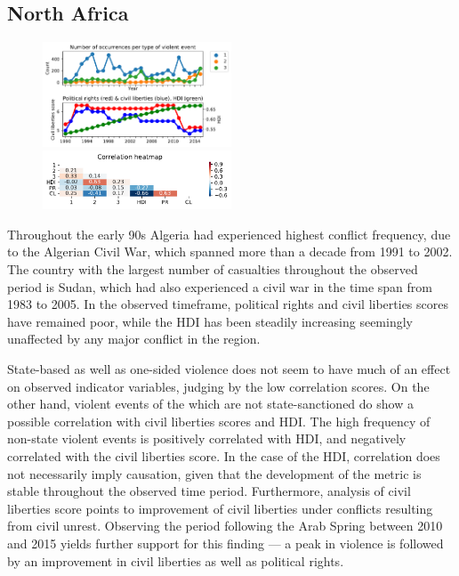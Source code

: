 \documentclass[a4paper,11pt]{article}
\begin{document}
\subsection{North Africa}
\begin{figure}[ht!]
    \includegraphics[width=0.50\textwidth]{images/na.pdf}
    \includegraphics[width=0.50\textwidth]{images/na_corr.pdf}
\end{figure}
Throughout the early 90s Algeria had experienced highest conflict frequency, due to the Algerian Civil War, which spanned more than a decade from 1991 to 2002. The country with the largest number of casualties throughout the observed period is Sudan, which had also experienced a civil war in the time span from 1983 to 2005. In the observed timeframe, political rights and civil liberties scores have remained poor, while the HDI has been steadily increasing seemingly unaffected by any major conflict in the region.

State-based as well as one-sided violence does not seem to have much of an effect on observed indicator variables, judging by the low correlation scores. On the other hand, violent events of the which are not state-sanctioned do show a possible correlation with civil liberties scores and HDI. The high frequency of non-state violent events is positively correlated with HDI, and negatively correlated with the civil liberties score. In the case of the HDI, correlation does not necessarily imply causation, given that the development of the metric is stable throughout the observed time period. Furthermore, analysis of civil liberties score points to improvement of civil liberties under conflicts resulting from civil unrest. Observing the period following the Arab Spring between 2010 and 2015 yields further support for this finding --- a peak in violence is followed by an improvement in civil liberties as well as political rights.
\end{document}
